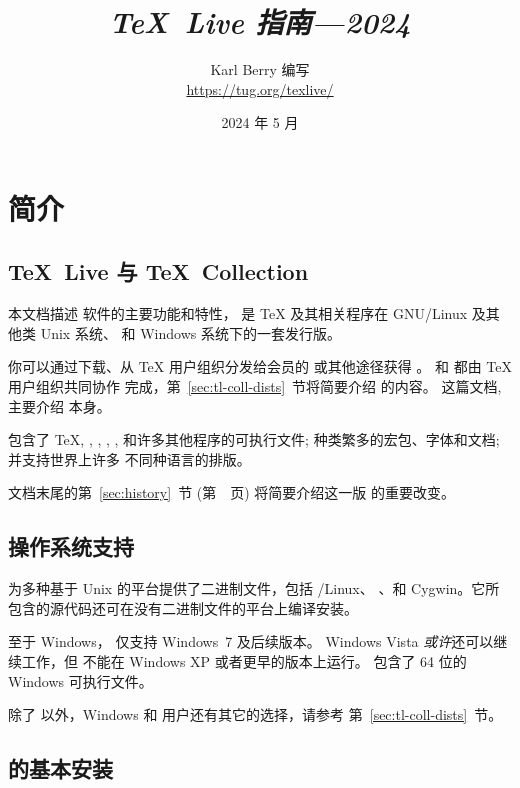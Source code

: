 \documentclass{article}
\title{%
  {\huge \textit{\TeX\ Live 指南---2024}}%
}
\author{Karl Berry 编写 \\[3mm]
        \url{https://tug.org/texlive/}
       }
\date{2024 年 5 月}
\begin{document}
\maketitle

\begin{multicols}{2}
\tableofcontents
\end{multicols}

\section{简介}
\label{sec:intro}

\subsection{\protect\TeX\protect\ Live 与 \protect\TeX\protect\ Collection}

本文档描述 \TL{} 软件的主要功能和特性，\TL{} 是 \TeX{} 及其相关程序在
GNU/Linux 及其他类 Unix 系统、\macOS{} 和 Windows
系统下的一套发行版。

你可以通过下载、从 \TeX{} 用户组织分发给会员的 \TK{}
\DVD{} 或其他途径获得 \TL{}。\TL{} 和 \TK{} 都由 \TeX{} 用户组织共同协作
完成，第~\ref{sec:tl-coll-dists}~节将简要介绍 \DVD 的内容。
这篇文档, 主要介绍 \TL{} 本身。

\TL{} 包含了 \TeX{}, \LaTeXe{}, \ConTeXt, \MF, \MP, \BibTeX{}
和许多其他程序的可执行文件; 种类繁多的宏包、字体和文档; 并支持世界上许多
不同种语言的排版。

文档末尾的第~\ref{sec:history}~节 (第~\pageref{sec:history}~页)
将简要介绍这一版 \TL{} 的重要改变。

\subsection{操作系统支持}
\label{sec:os-support}

\TL{} 为多种基于 Unix 的平台提供了二进制文件，包括 \GNU/Linux、
\macOS{}、和 Cygwin。它所包含的源代码还可在没有二进制文件的平台上编译安装。

至于 Windows，\TL{} 仅支持 Windows~7 及后续版本。
Windows Vista \emph{或许}还可以继续工作，但 \TL{} 不能在 Windows XP
或者更早的版本上运行。\TL{} 包含了 64 位的 Windows
可执行文件。

除了 \TL{} 以外，Windows 和 \macOS{} 用户还有其它的选择，请参考
第~\ref{sec:tl-coll-dists}~节。

\subsection{\protect\TL{} 的基本安装}
\label{sec:basic}
\end{document}
